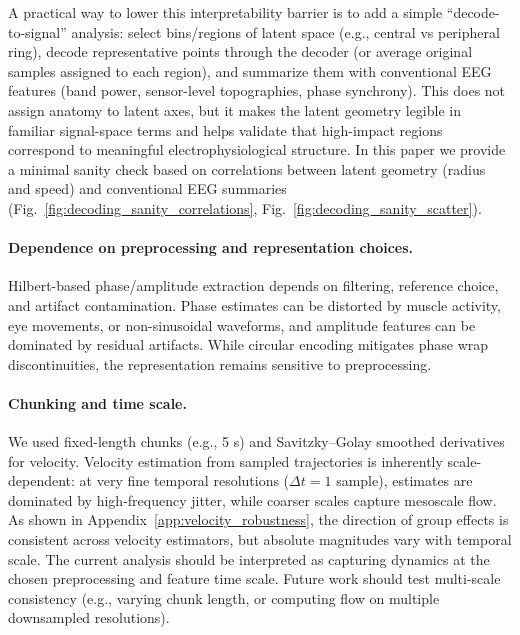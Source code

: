 \documentclass[5p,twocolumn,authoryear]{elsarticle}
\newcommand{\figref}[1]{Fig.~\ref{#1}}
\begin{document}
A practical way to lower this interpretability barrier is to add a simple ``decode-to-signal'' analysis: select bins/regions of latent space (e.g., central vs peripheral ring), decode representative points through the decoder (or average original samples assigned to each region), and summarize them with conventional EEG features (band power, sensor-level topographies, phase synchrony). This does not assign anatomy to latent axes, but it makes the latent geometry legible in familiar signal-space terms and helps validate that high-impact regions correspond to meaningful electrophysiological structure. In this paper we provide a minimal sanity check based on correlations between latent geometry (radius and speed) and conventional EEG summaries (\figref{fig:decoding_sanity_correlations}, \figref{fig:decoding_sanity_scatter}).

\paragraph{Dependence on preprocessing and representation choices.}
Hilbert-based phase/amplitude extraction depends on filtering, reference choice, and artifact contamination. Phase estimates can be distorted by muscle activity, eye movements, or non-sinusoidal waveforms, and amplitude features can be dominated by residual artifacts. While circular encoding mitigates phase wrap discontinuities, the representation remains sensitive to preprocessing. 

\paragraph{Chunking and time scale.}
We used fixed-length chunks (e.g., 5 s) and Savitzky--Golay smoothed derivatives for velocity. Velocity estimation from sampled trajectories is inherently scale-dependent: at very fine temporal resolutions ($\Delta t = 1$ sample), estimates are dominated by high-frequency jitter, while coarser scales capture mesoscale flow. As shown in Appendix~\ref{app:velocity_robustness}, the direction of group effects is consistent across velocity estimators, but absolute magnitudes vary with temporal scale. The current analysis should be interpreted as capturing dynamics at the chosen preprocessing and feature time scale. Future work should test multi-scale consistency (e.g., varying chunk length, or computing flow on multiple downsampled resolutions).
\end{document}

